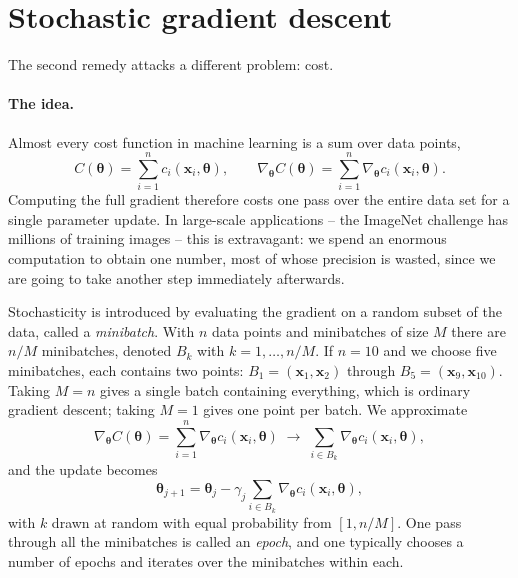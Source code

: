 \section{Stochastic gradient descent}
\label{sec:sgd}

The second remedy attacks a different problem: cost.

\paragraph{The idea.}
Almost every cost function in machine learning is a sum over data points,
\begin{equation}
  C(\bm{\theta}) = \sum_{i=1}^{n} c_i(\bm{x}_i,\bm{\theta}),
  \qquad
  \nabla_{\bm{\theta}}C(\bm{\theta})
   = \sum_{i=1}^{n}\nabla_{\bm{\theta}}c_i(\bm{x}_i,\bm{\theta}) .
  \label{eq:4-costsum}
\end{equation}
Computing the full gradient therefore costs one pass over the entire data set
for a single parameter update.  In large-scale applications -- the ImageNet
challenge has millions of training images -- this is extravagant: we spend an
enormous computation to obtain one number, most of whose precision is wasted,
since we are going to take another step immediately afterwards.

Stochasticity is introduced by evaluating the gradient on a random subset of
the data, called a \emph{minibatch}.  With $n$ data points and minibatches of
size $M$ there are $n/M$ minibatches, denoted $B_k$ with $k=1,\dots,n/M$.  If
$n=10$ and we choose five minibatches, each contains two points:
$B_1=(\bm{x}_1,\bm{x}_2)$ through $B_5=(\bm{x}_9,\bm{x}_{10})$.  Taking $M=n$
gives a single batch containing everything, which is ordinary gradient
descent; taking $M=1$ gives one point per batch.  We approximate
\begin{equation}
  \nabla_{\bm{\theta}}C(\bm{\theta})
   = \sum_{i=1}^{n}\nabla_{\bm{\theta}}c_i(\bm{x}_i,\bm{\theta})
   \;\longrightarrow\;
   \sum_{i\in B_k}\nabla_{\bm{\theta}}c_i(\bm{x}_i,\bm{\theta}),
  \label{eq:4-sgdgradient}
\end{equation}
and the update becomes
\begin{equation}
  \bm{\theta}_{j+1} = \bm{\theta}_j
    - \gamma_j\sum_{i\in B_k}\nabla_{\bm{\theta}}c_i(\bm{x}_i,\bm{\theta}),
  \label{eq:4-sgdupdate}
\end{equation}
with $k$ drawn at random with equal probability from $[1,n/M]$.  One pass
through all the minibatches is called an \emph{epoch}, and one typically
chooses a number of epochs and iterates over the minibatches within each.


